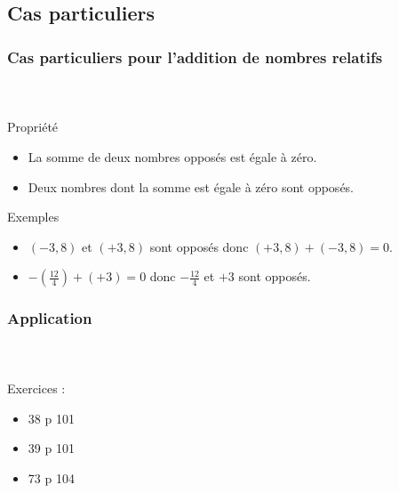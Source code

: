 \documentclass{beamer}
\begin{document}
\subsection{Cas particuliers}
\begin{frame}
	\frametitle{Cas particuliers pour l'addition de nombres relatifs}  
	\framesubtitle{ \ }	
	
	\begin{block}{Propriété}
		\begin{itemize}
			\item La somme de deux nombres opposés est égale à zéro.
			\item Deux nombres dont la somme est égale à zéro sont opposés.\pause
		\end{itemize}
	\end{block}
	
	\begin{exampleblock}{Exemples}
		\begin{itemize}
			\item $(-3,8)$  et $(+3,8)$ sont opposés donc $(+3,8) + (-3,8) = 0$.
			\item $-(\frac{12}{4}) + (+3) = 0$ donc $-\frac{12}{4}$  et $+3$ sont opposés.
		\end{itemize}
	\end{exampleblock}
	
\end{frame}

\begin{frame}
	\frametitle{Application}  
	\framesubtitle{ \ }	
	
	Exercices :
	\begin{itemize}
		\item 38 p 101
		\item 39 p 101
		\item 73 p 104
	\end{itemize}
\end{frame}
\end{document}
